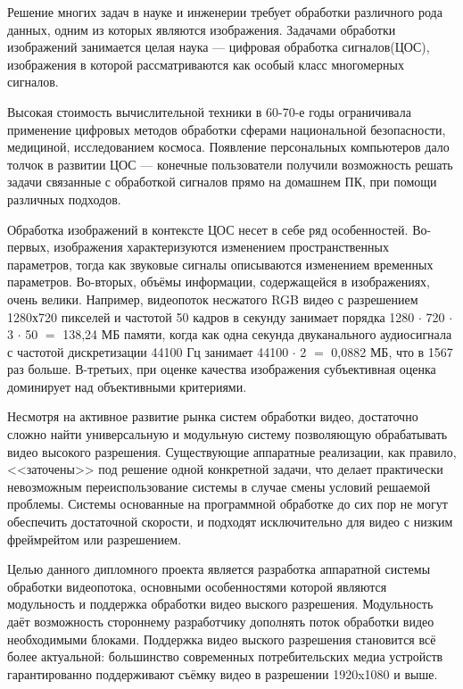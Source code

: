 \label{sec:intro}

Решение многих задач в науке и инженерии требует обработки различного рода данных, одним из которых являются изображения.
Задачами обработки изображений занимается целая наука --- цифровая обработка сигналов(ЦОС),
изображения в которой рассматриваются как особый класс многомерных сигналов.

Высокая стоимость вычислительной техники в 60-70-е годы ограничивала применение
цифровых методов обработки сферами национальной безопасности, медициной, исследованием космоса.
Появление персональных компьютеров дало толчок в развитии ЦОС --- конечные пользователи
получили возможность решать задачи связанные с обработкой сигналов прямо на домашнем ПК,
при помощи различных подходов.

Обработка изображений в контексте ЦОС несет в себе ряд особенностей.
Во-первых, изображения характеризуются изменением пространственных параметров, тогда как звуковые сигналы описываются изменением временных параметров.
Во-вторых, объёмы информации, содержащейся в изображениях, очень велики.
Например, видеопоток несжатого RGB видео
с разрешением 1280х720 пикселей и частотой 50 кадров в секунду
занимает порядка 1280 $\cdot$ 720 $\cdot$ 3 $\cdot$ 50 $=$ 138,24 МБ памяти, когда как одна
секунда двуканального аудиосигнала с частотой дискретизации 44100 Гц
занимает 44100 $\cdot$ 2 $=$ 0,0882 МБ, что в 1567 раз больше. В-третьих, при оценке качества
изображения субъективная оценка доминирует над объективными критериями.

Несмотря на активное развитие рынка систем обработки видео, достаточно сложно найти
универсальную и модульную систему позволяющую обрабатывать видео высокого разрешения.
Существующие аппаратные реализации, как правило, <<заточены>> под решение одной конкретной задачи,
что делает практически невозможным переиспользование системы в случае смены условий решаемой проблемы.
Системы основанные на программной обработке до сих пор не могут обеспечить достаточной скорости, и подходят исключительно для видео с низким фреймрейтом или разрешением. %


Целью данного дипломного проекта является разработка аппаратной системы обработки
видеопотока, основными особенностями которой являются модульность и поддержка
обработки видео выского разрешения. Модульность даёт возможность стороннему
разработчику дополнять поток обработки видео необходимыми блоками.
Поддержка видео выского разрешения становится всё более актуальной:
большинство современных потребительских медиа устройств гарантированно
поддерживают съёмку видео в разрешении 1920x1080 и выше. %


